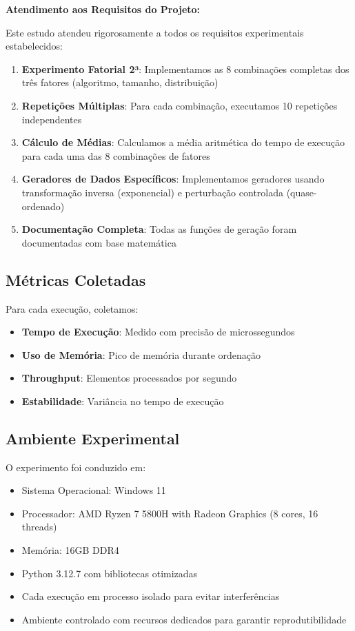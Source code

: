 \documentclass[conference]{IEEEtran}
\begin{document}
\textbf{Atendimento aos Requisitos do Projeto:}

Este estudo atendeu rigorosamente a todos os requisitos experimentais estabelecidos:

\begin{enumerate}
\item \textbf{Experimento Fatorial 2³}: Implementamos as 8 combinações completas dos três fatores (algoritmo, tamanho, distribuição)
\item \textbf{Repetições Múltiplas}: Para cada combinação, executamos 10 repetições independentes  
\item \textbf{Cálculo de Médias}: Calculamos a média aritmética do tempo de execução para cada uma das 8 combinações de fatores
\item \textbf{Geradores de Dados Específicos}: Implementamos geradores usando transformação inversa (exponencial) e perturbação controlada (quase-ordenado)
\item \textbf{Documentação Completa}: Todas as funções de geração foram documentadas com base matemática
\end{enumerate}

\subsection{Métricas Coletadas}

Para cada execução, coletamos:

\begin{itemize}
\item \textbf{Tempo de Execução}: Medido com precisão de microssegundos
\item \textbf{Uso de Memória}: Pico de memória durante ordenação
\item \textbf{Throughput}: Elementos processados por segundo
\item \textbf{Estabilidade}: Variância no tempo de execução
\end{itemize}

\subsection{Ambiente Experimental}

O experimento foi conduzido em:
\begin{itemize}
\item Sistema Operacional: Windows 11
\item Processador: AMD Ryzen 7 5800H with Radeon Graphics (8 cores, 16 threads)
\item Memória: 16GB DDR4
\item Python 3.12.7 com bibliotecas otimizadas
\item Cada execução em processo isolado para evitar interferências
\item Ambiente controlado com recursos dedicados para garantir reprodutibilidade
\end{itemize}
\end{document}
